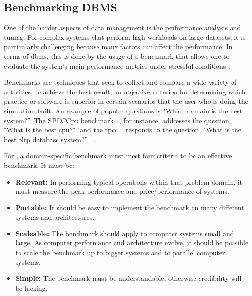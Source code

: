 
\subsection{Benchmarking DBMS}

One of the harder aspects of data management is the performance analysis and tuning. For complex systems that perform high workloads on large datasets, it is particularly challenging because many factors can affect the performance. In terms of \gls{dbms}, this is done by the usage of a benchmark that allows one to evaluate the system's main performance metrics under stressful conditions \cite{10.14778/2732240.2732246}.


Benchmarks are techniques that seek to collect and compare a wide variety of activities, to achieve the best result, an objective criterion for determining which practice or software is superior in certain scenarios that the user who
is doing the simulation built. An example of popular questions is "Which domain is the best system?”. The SPECCpu benchmark ~\cite{henning2006spec}, for instance, addresses the question, "What is the best \gls{cpu}?" "and the \gls{tpcc} ~\cite{council2010tpc} responds to the question, "What is the best \gls{oltp} database system?” ~\cite{benchmarkchen,benchcloud}.

For \citeauthor{gray1992benchmark}, a domain-specific benchmark must meet four criteria to be an effective benchmark. It must be:

\begin{itemize}
    \item \textbf{Relevant:} In performing typical operations within that problem domain, it must measure the peak performance and price/performance of systems. 
    \item \textbf{Portable:} It should be easy to implement the benchmark on many different systems and architectures.
    \item \textbf{Scaleable:}  The benchmark should apply to computer systems small and large. As computer performance and architecture evolve, it should be possible to scale the benchmark up to bigger systems and to parallel computer systems.
    \item \textbf{Simple:} The benchmark must be understandable, otherwise credibility will be lacking.
\end{itemize}




